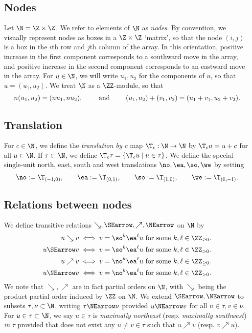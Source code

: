 \subsection{Nodes}
Let \(\N = \Z \times \Z\). We refer to elements of \(\N\) as {\em nodes}. By convention, we visually represent nodes as boxes in a \(\Z \times \Z\) `matrix', so that the node \((i,j)\) is a box in the \(i\)th row and \(j\)th column of the array. In this orientation, positive increase in the first component corresponds to a southward move in the array, and positive increase in the second component corresponds to an eastward move in the array. For \(u \in \N\), we will write \(u_1, u_2\) for the components of \(u\), so that \(u = (u_1, u_2)\). We treat \(\N\) as a \(\ZZ\)-module, so that
\begin{align*}
n(u_1, u_2) = (nu_1, nu_2), \qquad \textup{ and } \qquad (u_1,u_2) +(v_1, v_2) = (u_1 + v_1, u_2 + v_2).
\end{align*}






\subsection{Translation}
For \(c \in \N\), we define the {\em translation by \(c\)} map \(\T_c:\N \to \N\) by \(\T_cu = 
u+ c\) for all \(u \in \N\). If \(\tau \subset \N\), we define \(\T_c \tau = \{\T_c u \mid u \in \tau\}\).
We define the special single-unit north, east, south and west translations \(\no, \ea, \so, \we\) by setting 
\begin{align*}
\no := \T_{(-1,0)},\qquad \ea := \T_{(0,1)},\qquad \so := \T_{(1,0)},\qquad \we  := \T_{(0,-1)}.
\end{align*}


\subsection{Relations between nodes}
We define transitive relations \(\searrow, \SEarrow, \nearrow, \NEarrow\) on \(\N\) by
\begin{align*}
u \searrow v &\iff v = \so^k \ea^\ell u \textup{ for some }k,\ell \in \ZZ_{\geq 0}.\\
u \SEarrow v &\iff v = \so^k \ea^\ell u \textup{ for some }k,\ell \in \ZZ_{> 0}.\\
u \nearrow v &\iff v = \no^k \ea^\ell u \textup{ for some }k,\ell \in \ZZ_{\geq 0}.\\
u \NEarrow v &\iff v = \no^k \ea^\ell u \textup{ for some }k,\ell \in \ZZ_{> 0}.
\end{align*}
We note that \(\searrow, \nearrow\) are in fact partial orders on \(\N\), with \(\searrow\) being the product partial order induced by \(\ZZ\) on \(\N\). 
We extend \(\SEarrow, \NEarrow\) to subsets \(\tau, \nu \subset \N\), writing \(\tau \NEarrow \nu\) provided \(u \NEarrow v\) for all \(u \in \tau, v \in \nu\). 
For \(u \in \tau\subset \N\), we say \(u \in \tau\) is {\em maximally northeast} (resp. {\em maximally southwest}) {\em in} \(\tau\) provided that does not exist any \(u \neq v \in \tau\) such that \(u \nearrow v\) (resp. \(v \nearrow u\)).

